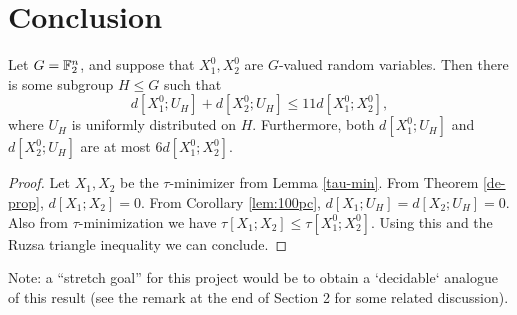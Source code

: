 \section{Conclusion}

\begin{theorem}\label{entropy-pfr}
  \leanok
  Let $G = \mathbb{F}_2^n$, and suppose that $X^0_1, X^0_2$ are $G$-valued random variables.
  Then there is some subgroup $H \leq G$ such that
  \[
    d[X^0_1;U_H] + d[X^0_2;U_H] \le 11 d[X^0_1;X^0_2],
  \]
  where $U_H$ is uniformly distributed on $H$.
  Furthermore, both $d[X^0_1;U_H]$ and $d[X^0_2;U_H]$ are at most $6 d[X^0_1;X^0_2]$.
\end{theorem}

\begin{proof}  \leanok  Let $X_1, X_2$ be the $\tau$-minimizer from Lemma \ref{tau-min}.  From Theorem \ref{de-prop}, $d[X_1;X_2]=0$.  From Corollary \ref{lem:100pc}, $d[X_1;U_H] = d[X_2; U_H] = 0$.  Also from $\tau$-minimization we have $\tau[X_1;X_2] \leq \tau[X^0_1;X^0_2]$.  Using this and the Ruzsa triangle inequality we can conclude.
\end{proof}

Note: a ``stretch goal'' for this project would be to obtain a `decidable` analogue of this result (see the remark at the end of Section 2 for some related discussion).

